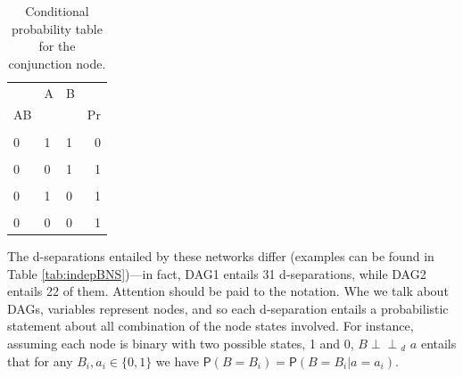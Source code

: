 \documentclass[
  10pt,
  dvipsnames,enabledeprecatedfontcommands]{scrartcl}
\newcommand{\indep}{\!\perp \!\!\! \perp\!}
\newcommand{\pr}[1]{\ensuremath{\mathsf{P}(#1)}}
\begin{document}
\begin{table}[h]
\begin{table}[H]
\centering
\begin{tabular}{lllr}
\toprule
\multicolumn{1}{c}{} & \multicolumn{1}{c}{A} & \multicolumn{1}{c}{B} & \multicolumn{1}{c}{} \\
AB &  &  & Pr\\
\midrule
\cellcolor{gray!6}{1} & \cellcolor{gray!6}{1} & \cellcolor{gray!6}{1} & \cellcolor{gray!6}{1}\\
0 & 1 & 1 & 0\\
\cellcolor{gray!6}{1} & \cellcolor{gray!6}{0} & \cellcolor{gray!6}{1} & \cellcolor{gray!6}{0}\\
0 & 0 & 1 & 1\\
\cellcolor{gray!6}{1} & \cellcolor{gray!6}{1} & \cellcolor{gray!6}{0} & \cellcolor{gray!6}{0}\\
0 & 1 & 0 & 1\\
\cellcolor{gray!6}{1} & \cellcolor{gray!6}{0} & \cellcolor{gray!6}{0} & \cellcolor{gray!6}{0}\\
0 & 0 & 0 & 1\\
\bottomrule
\end{tabular}
\end{table}
\normalsize
\caption{Conditional probability table for the conjunction node.}
\label{tab:CPTconjunction2}
\end{table}

\newpage 
\vspace{1mm}
\footnotesize

\normalsize

The d-separations entailed by these networks differ (examples can be
found in Table \ref{tab:indepBNS})---in fact, \textsf{DAG1} entails 31
d-separations, while \textsf{DAG2} entails 22 of them. Attention should
be paid to the notation. Whe we talk about DAGs, variables represent
nodes, and so each d-separation entails a probabilistic statement about
all combination of the node states involved. For instance, assuming each
node is binary with two possible states, 1 and 0,
\mbox{$B   \indep_d\,\,  a $} entails that for any
\mbox{$ B_i, a_i \in \{0, 1\}$} we have
\(\pr{B = B_i} = \pr{B = B_i \vert a = a_i}\).
\end{document}
